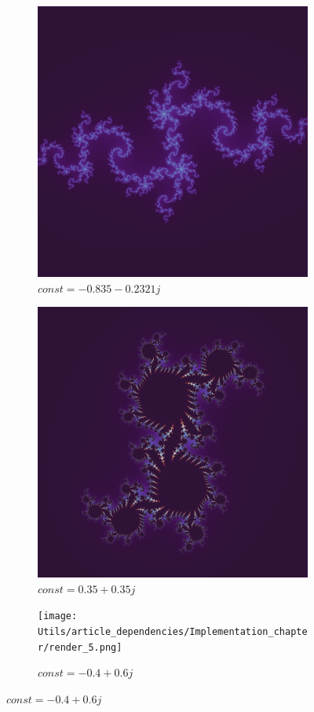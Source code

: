 \documentclass{article}
\begin{document}
\begin{figure}[H]
\begin{subfigure}[b]{0.45\linewidth}
		\includegraphics[width=\linewidth]{Utils/article_dependencies/Implementation_chapter/render_3.png}
		\caption{\footnotesize $const = -0.835 - 0.2321j$}
	\end{subfigure}
	
	\begin{subfigure}[b]{0.45\linewidth}
		\includegraphics[width=\linewidth]{Utils/article_dependencies/Implementation_chapter/render_4.png}
		\caption{\footnotesize $const = 0.35 + 0.35j$}
	\end{subfigure}
	\hfill
	\begin{subfigure}[b]{0.45\linewidth}
		\texttt{[image: Utils/article\_dependencies/Implementation\_chapter/render\_5.png]}
		\caption{\footnotesize $const = -0.4 + 0.6j$}
	\end{subfigure}
	

\end{figure}
\end{document}
